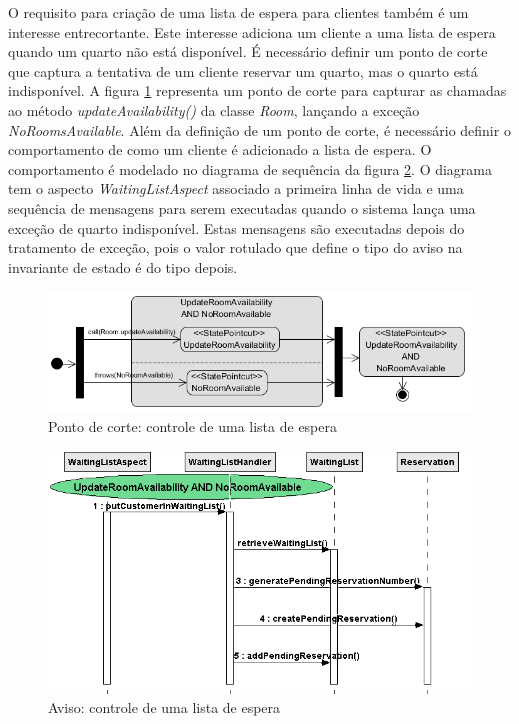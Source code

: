 O requisito para criação de uma lista de espera para clientes também é um interesse entrecortante. Este interesse adiciona um cliente a uma lista de
espera quando um quarto não está disponível. É necessário definir um ponto de corte que captura a tentativa de um cliente reservar um
quarto, mas o quarto está indisponível. A figura \ref{fig:case_study_behavioral_pointcut_waiting_list} representa um ponto de corte
para capturar as chamadas ao método \textit{updateAvailability()} da classe \textit{Room}, lançando a exceção \textit{NoRoomsAvailable}. Além da
definição de um ponto de corte, é necessário definir o comportamento de como um cliente é adicionado a lista de espera. O comportamento é modelado no
diagrama de sequência da figura \ref{fig:case_study_behavioral_waiting_list}. O diagrama tem o aspecto \textit{WaitingListAspect} associado a primeira 
linha de vida e uma sequência de mensagens para serem executadas quando o sistema lança uma exceção de quarto indisponível. Estas
mensagens são executadas depois do tratamento de exceção, pois o valor rotulado que define o tipo do aviso na invariante de estado é do tipo depois.

  \begin{figure}[tb]
	\centering
	\includegraphics[scale=0.8]{img/case_study_behavioral_pointcut_waiting_list.png}
	\caption{Ponto de corte: controle de uma lista de espera}\label{fig:case_study_behavioral_pointcut_waiting_list}
  \end{figure}
  
  \begin{figure}[!h]
	\centering
	\includegraphics{img/case_study_behavioral_waiting_list.png}
	\caption{Aviso: controle de uma lista de espera}\label{fig:case_study_behavioral_waiting_list}
  \end{figure}

